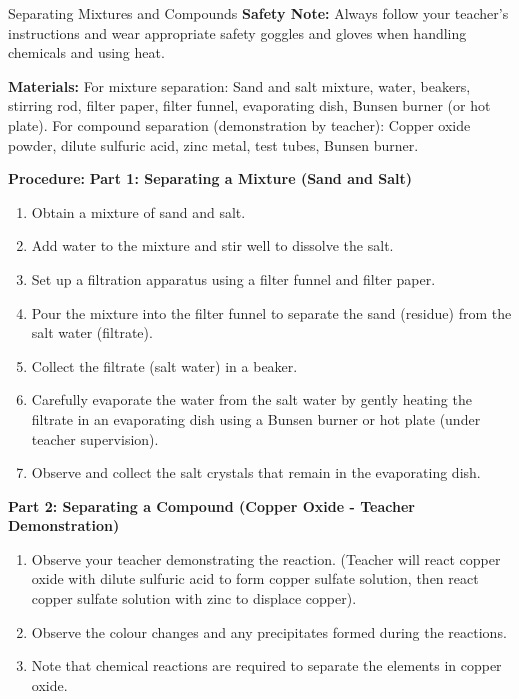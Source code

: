 \begin{investigation}{Separating Mixtures and Compounds}
\textbf{Safety Note:}  Always follow your teacher's instructions and wear appropriate safety goggles and gloves when handling chemicals and using heat.

\textbf{Materials:}  For mixture separation: Sand and salt mixture, water, beakers, stirring rod, filter paper, filter funnel, evaporating dish, Bunsen burner (or hot plate). For compound separation (demonstration by teacher): Copper oxide powder, dilute sulfuric acid, zinc metal, test tubes, Bunsen burner.

\textbf{Procedure:}
\textbf{Part 1: Separating a Mixture (Sand and Salt)}
\begin{enumerate}
    \item Obtain a mixture of sand and salt.
    \item Add water to the mixture and stir well to dissolve the salt.
    \item Set up a filtration apparatus using a filter funnel and filter paper.
    \item Pour the mixture into the filter funnel to separate the sand (residue) from the salt water (filtrate).
    \item Collect the filtrate (salt water) in a beaker.
    \item Carefully evaporate the water from the salt water by gently heating the filtrate in an evaporating dish using a Bunsen burner or hot plate (under teacher supervision).
    \item Observe and collect the salt crystals that remain in the evaporating dish.
\end{enumerate}

\textbf{Part 2: Separating a Compound (Copper Oxide - Teacher Demonstration)}
\begin{enumerate}
    \item Observe your teacher demonstrating the reaction.  (Teacher will react copper oxide with dilute sulfuric acid to form copper sulfate solution, then react copper sulfate solution with zinc to displace copper).
    \item Observe the colour changes and any precipitates formed during the reactions.
    \item Note that chemical reactions are required to separate the elements in copper oxide.
\end{enumerate}


\end{investigation}
